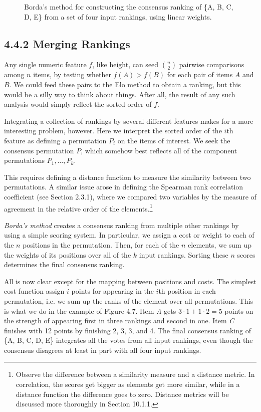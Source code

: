 \documentclass[10pt]{article}
\begin{document}
\begin{figure}
    \centering
    \caption{Borda’s method for constructing the consensus ranking of \{A, B, C, D, E\} from a set of four input rankings, using linear weights.}
\end{figure}

\subsection*{4.4.2 Merging Rankings}
Any single numeric feature \(f\), like height, can seed \(\binom{n}{2}\) pairwise comparisons among \(n\) items, by testing whether \(f(A) > f(B)\) for each pair of items \(A\) and \(B\). We could feed these pairs to the Elo method to obtain a ranking, but this would be a silly way to think about things. After all, the result of any such analysis would simply reflect the sorted order of \(f\).

Integrating a collection of rankings by several different features makes for a more interesting problem, however. Here we interpret the sorted order of the \(i\)th feature as defining a permutation \(P_i\) on the items of interest. We seek the consensus permutation \(P\), which somehow best reflects all of the component permutations \(P_1, \ldots, P_k\).

This requires defining a distance function to measure the similarity between two permutations. A similar issue arose in defining the Spearman rank correlation coefficient (see Section 2.3.1), where we compared two variables by the measure of agreement in the relative order of the elements.\footnote{Observe the difference between a similarity measure and a distance metric. In correlation, the scores get bigger as elements get more similar, while in a distance function the difference goes to zero. Distance metrics will be discussed more thoroughly in Section 10.1.1.}

\textit{Borda’s method} creates a consensus ranking from multiple other rankings by using a simple scoring system. In particular, we assign a cost or weight to each of the \(n\) positions in the permutation. Then, for each of the \(n\) elements, we sum up the weights of its positions over all of the \(k\) input rankings. Sorting these \(n\) scores determines the final consensus ranking.

All is now clear except for the mapping between positions and costs. The simplest cost function assign \(i\) points for appearing in the \(i\)th position in each permutation, i.e. we sum up the ranks of the element over all permutations. This is what we do in the example of Figure 4.7. Item \textit{A} gets \(3 \cdot 1 + 1 \cdot 2 = 5\) points on the strength of appearing first in three rankings and second in one. Item \textit{C} finishes with 12 points by finishing 2, 3, 3, and 4. The final consensus ranking of \{A, B, C, D, E\} integrates all the votes from all input rankings, even though the consensus disagrees at least in part with all four input rankings.
\end{document}
